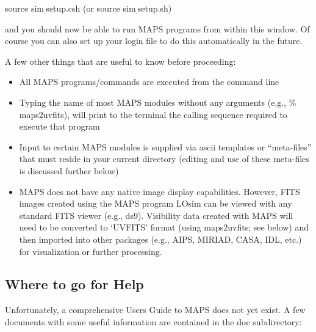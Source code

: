 \documentclass[12pt,psfig]{article}
\begin{document}
\bigskip

\noindent {\tiny \%} source sim$\underline~$setup.csh (or source sim$\underline~$setup.sh)

\bigskip

\noindent and you should now be able to run MAPS programs from within
this window. Of course you can also set up your login file to do this
automatically in the future. 

\smallskip

A few other things that are useful to know before proceeding:

\begin{itemize}

\item All MAPS programs/commands are executed from the command line

\item Typing the name of most MAPS modules without any arguments
  (e.g., {\footnotesize\% {\sf maps2uvfits}}), will print to the terminal the
  calling sequence required to execute that program

\item Input to certain MAPS modules is supplied via ascii templates
  or ``meta-files''
  that must reside in your current directory (editing and use of these
  meta-files is discussed
  further below)
  
\item MAPS does
  not have any native image display
  capabilities. However, FITS images created using the MAPS program {\sf LOsim} can be
  viewed with any standard FITS viewer (e.g., ds9). 
   Visibility data created with MAPS will need to be converted to
  `UVFITS' format (using {\sf maps2uvfits}; see below) and then
  imported into other 
packages (e.g., AIPS, MIRIAD, CASA, IDL, etc.)
  for visualization or further processing.

\end{itemize}

\subsection{Where to go for Help\protect\label{help}}
%
Unfortunately, a comprehensive Users Guide to MAPS does not yet
exist. A few documents with some useful information are
contained in the {\sf doc} subdirectory:
\end{document}
